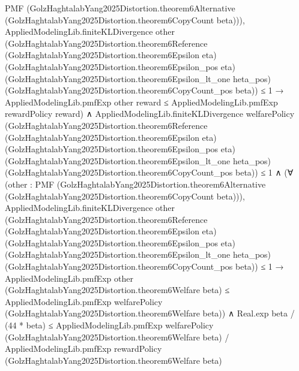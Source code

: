 \documentclass[10pt]{article}
\begin{document}
\begin{ReviewVerbatim}
                      PMF
                        (GolzHaghtalabYang2025Distortion.theorem6Alternative
                          (GolzHaghtalabYang2025Distortion.theorem6CopyCount beta))),
                    AppliedModelingLib.finiteKLDivergence other
                          (GolzHaghtalabYang2025Distortion.theorem6Reference
                            (GolzHaghtalabYang2025Distortion.theorem6Epsilon eta)
                            (GolzHaghtalabYang2025Distortion.theorem6Epsilon_pos eta)
                            (GolzHaghtalabYang2025Distortion.theorem6Epsilon_lt_one heta_pos)
                            (GolzHaghtalabYang2025Distortion.theorem6CopyCount_pos beta)) ≤
                        1 →
                      AppliedModelingLib.pmfExp other reward ≤ AppliedModelingLib.pmfExp rewardPolicy reward) ∧
                  AppliedModelingLib.finiteKLDivergence welfarePolicy
                        (GolzHaghtalabYang2025Distortion.theorem6Reference
                          (GolzHaghtalabYang2025Distortion.theorem6Epsilon eta)
                          (GolzHaghtalabYang2025Distortion.theorem6Epsilon_pos eta)
                          (GolzHaghtalabYang2025Distortion.theorem6Epsilon_lt_one heta_pos)
                          (GolzHaghtalabYang2025Distortion.theorem6CopyCount_pos beta)) ≤
                      1 ∧
                    (∀
                        (other :
                          PMF
                            (GolzHaghtalabYang2025Distortion.theorem6Alternative
                              (GolzHaghtalabYang2025Distortion.theorem6CopyCount beta))),
                        AppliedModelingLib.finiteKLDivergence other
                              (GolzHaghtalabYang2025Distortion.theorem6Reference
                                (GolzHaghtalabYang2025Distortion.theorem6Epsilon eta)
                                (GolzHaghtalabYang2025Distortion.theorem6Epsilon_pos eta)
                                (GolzHaghtalabYang2025Distortion.theorem6Epsilon_lt_one heta_pos)
                                (GolzHaghtalabYang2025Distortion.theorem6CopyCount_pos beta)) ≤
                            1 →
                          AppliedModelingLib.pmfExp other (GolzHaghtalabYang2025Distortion.theorem6Welfare beta) ≤
                            AppliedModelingLib.pmfExp welfarePolicy
                              (GolzHaghtalabYang2025Distortion.theorem6Welfare beta)) ∧
                      Real.exp beta / (44 * beta) ≤
                        AppliedModelingLib.pmfExp welfarePolicy (GolzHaghtalabYang2025Distortion.theorem6Welfare beta) /
                          AppliedModelingLib.pmfExp rewardPolicy (GolzHaghtalabYang2025Distortion.theorem6Welfare beta)
\end{ReviewVerbatim}
\end{document}
